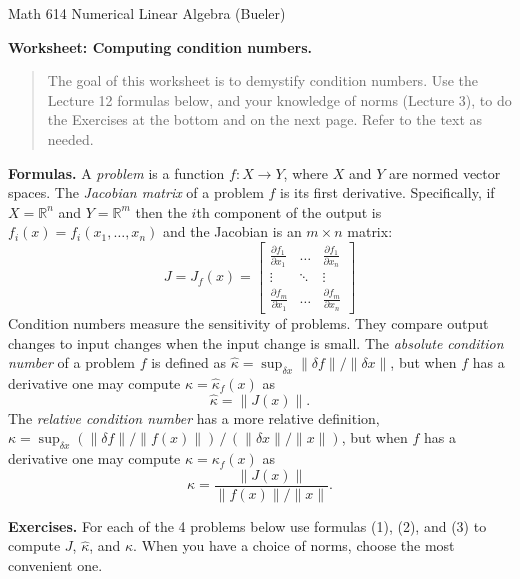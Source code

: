 \documentclass[11pt]{amsart}
\newcommand{\RR}{\mathbb{R}}
\begin{document}
\scriptsize \noindent Math 614 Numerical Linear Algebra (Bueler) \hfill {}
\normalsize\medskip

\Large\centerline{\textbf{Worksheet: Computing condition numbers.}}
\medskip
\normalsize

\thispagestyle{empty}

\begin{quote}
The goal of this worksheet is to demystify condition numbers.  Use the Lecture 12 formulas below, and your knowledge of norms (Lecture 3), to do the Exercises at the bottom and on the next page.  Refer to the text as needed.
\end{quote}

\bigskip
\noindent \textbf{Formulas.}  A \emph{problem} is a function $f:X \to Y$, where $X$ and $Y$ are normed vector spaces.  The \emph{Jacobian matrix} of a problem $f$ is its first derivative.  Specifically, if $X=\RR^n$ and $Y=\RR^m$ then the $i$th component of the output is $f_i(x)=f_i(x_1,\dots,x_n)$ and the Jacobian is an $m\times n$ matrix:
\begin{equation}
J = J_f(x) = \begin{bmatrix} \frac{\partial f_1}{\partial x_1} & \dots & \frac{\partial f_1}{\partial x_n} \\ \vdots & \ddots & \vdots \\ \frac{\partial f_m}{\partial x_1} & \dots & \frac{\partial f_m}{\partial x_n} \end{bmatrix}
\end{equation}
Condition numbers measure the sensitivity of problems.  They compare output changes to input changes when the input change is small.  The \emph{absolute condition number} of a problem $f$ is defined as $\hat \kappa = \sup_{\delta x} \|\delta f\|/\|\delta x\|$, but when $f$ has a derivative one may compute $\hat \kappa = \hat \kappa_f(x)$ as
\begin{equation}
\hat \kappa = \|J(x)\|.
\end{equation}
The \emph{relative condition number} has a more relative definition, $\kappa = \sup_{\delta x} (\|\delta f\|/\|f(x)\|) \,/\, (\|\delta x\|/\|x\|)$, but when $f$ has a derivative one may compute $\kappa = \kappa_f(x)$ as
\begin{equation}
\kappa = \frac{\|J(x)\|}{\|f(x)\|/\|x\|}.
\end{equation}

\bigskip
\noindent \textbf{Exercises.}  For each of the 4 problems below use formulas (1), (2), and (3) to compute $J$, $\hat \kappa$, and $\kappa$.  When you have a choice of norms, choose the most convenient one.
\end{document}
